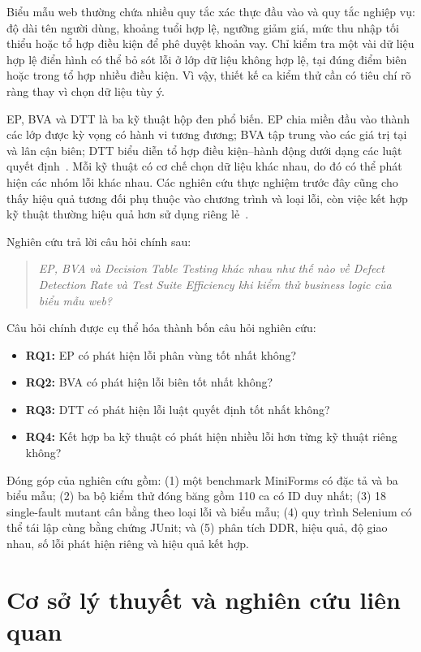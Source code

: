 \documentclass[runningheads]{llncs}
\begin{document}
Biểu mẫu web thường chứa nhiều quy tắc xác thực đầu vào và quy tắc nghiệp vụ: độ dài tên người dùng, khoảng tuổi hợp lệ, ngưỡng giảm giá, mức thu nhập tối thiểu hoặc tổ hợp điều kiện để phê duyệt khoản vay. Chỉ kiểm tra một vài dữ liệu hợp lệ điển hình có thể bỏ sót lỗi ở lớp dữ liệu không hợp lệ, tại đúng điểm biên hoặc trong tổ hợp nhiều điều kiện. Vì vậy, thiết kế ca kiểm thử cần có tiêu chí rõ ràng thay vì chọn dữ liệu tùy ý.

EP, BVA và DTT là ba kỹ thuật hộp đen phổ biến. EP chia miền đầu vào thành các lớp được kỳ vọng có hành vi tương đương; BVA tập trung vào các giá trị tại và lân cận biên; DTT biểu diễn tổ hợp điều kiện--hành động dưới dạng các luật quyết định~\cite{istqb2021ctfl}. Mỗi kỹ thuật có cơ chế chọn dữ liệu khác nhau, do đó có thể phát hiện các nhóm lỗi khác nhau. Các nghiên cứu thực nghiệm trước đây cũng cho thấy hiệu quả tương đối phụ thuộc vào chương trình và loại lỗi, còn việc kết hợp kỹ thuật thường hiệu quả hơn sử dụng riêng lẻ~\cite{roper1997empirical,reid1997analysis}.

Nghiên cứu trả lời câu hỏi chính sau:

\begin{quote}
\emph{EP, BVA và Decision Table Testing khác nhau như thế nào về Defect Detection Rate và Test Suite Efficiency khi kiểm thử business logic của biểu mẫu web?}
\end{quote}

Câu hỏi chính được cụ thể hóa thành bốn câu hỏi nghiên cứu:
\begin{itemize}[leftmargin=*]
  \item \textbf{RQ1:} EP có phát hiện lỗi phân vùng tốt nhất không?
  \item \textbf{RQ2:} BVA có phát hiện lỗi biên tốt nhất không?
  \item \textbf{RQ3:} DTT có phát hiện lỗi luật quyết định tốt nhất không?
  \item \textbf{RQ4:} Kết hợp ba kỹ thuật có phát hiện nhiều lỗi hơn từng kỹ thuật riêng không?
\end{itemize}

Đóng góp của nghiên cứu gồm: (1) một benchmark MiniForms có đặc tả và ba biểu mẫu; (2) ba bộ kiểm thử đóng băng gồm 110 ca có ID duy nhất; (3) 18 single-fault mutant cân bằng theo loại lỗi và biểu mẫu; (4) quy trình Selenium có thể tái lập cùng bằng chứng JUnit; và (5) phân tích DDR, hiệu quả, độ giao nhau, số lỗi phát hiện riêng và hiệu quả kết hợp.

\section{Cơ sở lý thuyết và nghiên cứu liên quan}
\label{sec:related}
\end{document}
